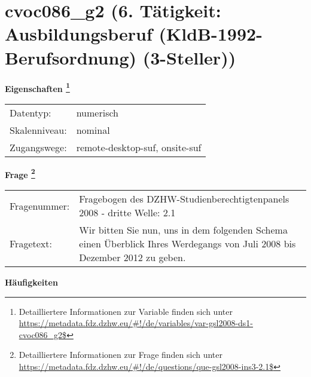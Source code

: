 
    \setcounter{footnote}{0}

    \vspace*{-1.8cm}
	\section{cvoc086\_g2 (6. Tätigkeit: Ausbildungsberuf (KldB-1992-Berufsordnung) (3-Steller))}
	\label{section:cvoc086_g2}



    \vspace*{0.5cm}
    \noindent\textbf{Eigenschaften
	\footnote{Detailliertere Informationen zur Variable finden sich unter
		\url{https://metadata.fdz.dzhw.eu/\#!/de/variables/var-gsl2008-ds1-cvoc086_g2$}}}\\
	\begin{tabularx}{\hsize}{@{}lX}
	Datentyp: & numerisch \\
	Skalenniveau: & nominal \\
	Zugangswege: &
	  remote-desktop-suf, 
	  onsite-suf
 \\
    \end{tabularx}



				\vspace*{0.5cm}
                \noindent\textbf{Frage
	                \footnote{Detailliertere Informationen zur Frage finden sich unter
		              \url{https://metadata.fdz.dzhw.eu/\#!/de/questions/que-gsl2008-ins3-2.1$}}}\\
				\begin{tabularx}{\hsize}{@{}lX}
					Fragenummer: &
					  Fragebogen des DZHW-Studienberechtigtenpanels 2008 - dritte Welle:
					  2.1
 \\
					Fragetext: & Wir bitten Sie nun, uns in dem folgenden Schema einen Überblick Ihres Werdegangs von Juli 2008 bis Dezember 2012 zu geben. \\
				\end{tabularx}





        		\vspace*{0.5cm}
                \noindent\textbf{Häufigkeiten}

